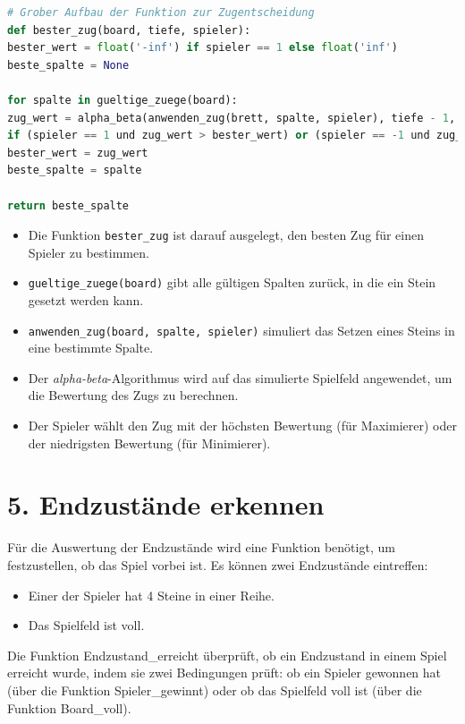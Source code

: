 \begin{lstlisting}[language=Python, caption=Entscheidung für den besten Zug - Überblick]
# Grober Aufbau der Funktion zur Zugentscheidung
def bester_zug(board, tiefe, spieler):
bester_wert = float('-inf') if spieler == 1 else float('inf')
beste_spalte = None

for spalte in gueltige_zuege(board):
zug_wert = alpha_beta(anwenden_zug(brett, spalte, spieler), tiefe - 1, -float('inf'), float('inf'), False)
if (spieler == 1 und zug_wert > bester_wert) or (spieler == -1 und zug_wert < bester_wert):
bester_wert = zug_wert
beste_spalte = spalte

return beste_spalte
\end{lstlisting}
\begin{itemize}

	\item Die Funktion \texttt{bester\_zug} ist darauf ausgelegt, den besten Zug für einen Spieler zu bestimmen. 
	\item \texttt{gueltige\_zuege(board)} gibt alle gültigen Spalten zurück, in die ein Stein gesetzt werden kann. 
	\item \texttt{anwenden\_zug(board, spalte, spieler)} simuliert das Setzen eines Steins in eine bestimmte Spalte. 
	\item Der \emph{alpha-beta}-Algorithmus wird auf das simulierte Spielfeld angewendet, um die Bewertung des Zugs zu berechnen. 
	\item Der Spieler wählt den Zug mit der höchsten Bewertung (für Maximierer) oder der niedrigsten Bewertung (für Minimierer).
\end{itemize}

\section*{5. Endzustände erkennen}

Für die Auswertung der Endzustände wird eine Funktion benötigt, um festzustellen, ob das Spiel vorbei ist. Es können zwei Endzustände eintreffen:
\begin{itemize}
	\item Einer der Spieler hat 4 Steine in einer Reihe.
	\item Das Spielfeld ist voll.
\end{itemize}

Die Funktion Endzustand\_erreicht überprüft, ob ein Endzustand in einem Spiel erreicht wurde, indem sie zwei Bedingungen prüft: ob ein Spieler gewonnen hat (über die Funktion Spieler\_gewinnt) oder ob das Spielfeld voll ist (über die Funktion Board\_voll). 

